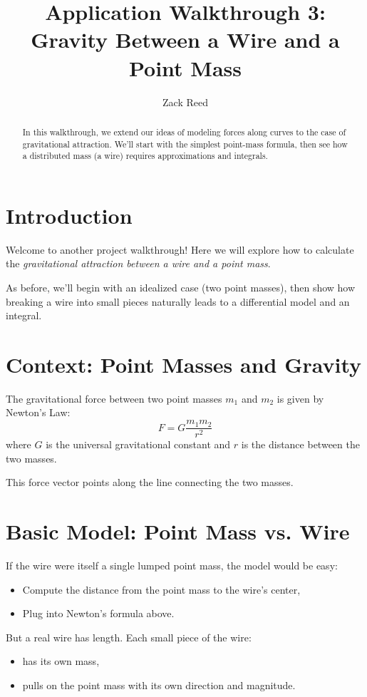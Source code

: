\documentclass{ximera}
\title{Application Walkthrough 3: Gravity Between a Wire and a Point Mass}
\author{Zack Reed}
\begin{document}
\begin{abstract}
In this walkthrough, we extend our ideas of modeling forces along curves to the case of gravitational attraction. We'll start with the simplest point-mass formula, then see how a distributed mass (a wire) requires approximations and integrals.
\end{abstract}
\maketitle

\section*{Introduction}

Welcome to another project walkthrough!  
Here we will explore how to calculate the \emph{gravitational attraction between a wire and a point mass}.  

As before, we'll begin with an idealized case (two point masses), then show how breaking a wire into small pieces naturally leads to a differential model and an integral.

\section*{Context: Point Masses and Gravity}

The gravitational force between two point masses $m_1$ and $m_2$ is given by Newton's Law:
$$
F = G \frac{m_1 m_2}{r^2}
$$
where $G$ is the universal gravitational constant and $r$ is the distance between the two masses.  

This force vector points along the line connecting the two masses.

\section*{Basic Model: Point Mass vs. Wire}

If the wire were itself a single lumped point mass, the model would be easy:
\begin{itemize}
\item Compute the distance from the point mass to the wire's center,
\item Plug into Newton's formula above.
\end{itemize}

But a real wire has length. Each small piece of the wire:
\begin{itemize}
\item has its own mass,
\item pulls on the point mass with its own direction and magnitude.
\end{itemize}
\end{document}
